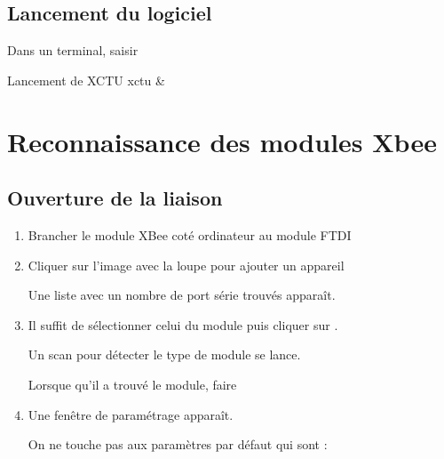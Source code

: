 {\subsection{Lancement du logiciel}

Dans un terminal, saisir
\begin{Bash}{Lancement de XCTU}
xctu &
\end{Bash}


\section{Reconnaissance des modules Xbee}

\subsection{Ouverture de la liaison}

\begin{enumerate}
\item  Brancher le module XBee coté ordinateur au module FTDI 

\item Cliquer sur l'image avec la loupe pour ajouter un appareil 




Une liste avec un nombre de port série trouvés apparaît.


\item Il suffit de sélectionner celui du module puis cliquer sur .

Un scan pour détecter le type de module se lance.


Lorsque qu'il a trouvé le module, faire 

\item Une fenêtre de paramétrage apparaît.


On ne touche pas aux paramètres par défaut qui sont : 



\end{enumerate}}
